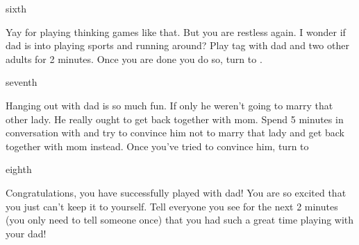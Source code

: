 \documentclass[notebook]{guildcamp1}
\begin{document}
\begin{page}{sixth}

Yay for playing thinking games like that. But you are restless again. I wonder if dad is into playing sports and running around? Play tag with dad and two other adults for 2 minutes. Once you are done you do so, turn to .

\end{page}

\begin{page}{seventh}

Hanging out with dad is so much fun. If only he weren't going to marry that other lady. He really ought to get back together with mom. Spend 5 minutes in conversation with \cGroomA{} and try to convince him not to marry that lady and get back together with mom instead. Once you've tried to convince him, turn to 

\end{page}

\begin{page}{eighth}

Congratulations, you have successfully played with dad! You are so excited that you just can't keep it to yourself. Tell everyone you see for the next 2 minutes (you only need to tell someone once) that you had such a great time playing with your dad!

\end{page}

\endnotebook
\end{document}
